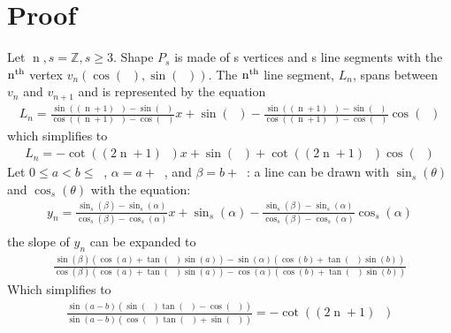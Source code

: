 \documentclass[11pt]{article}
\DeclareMathOperator{\custd}{\mathrm{d}_s}
\DeclareMathOperator{\custi}{\mathrm{n}}
\DeclareMathOperator{\period}{\frac{2\pi}{s}}
\DeclareMathOperator{\hp}{\frac{\pi}{s}}
\DeclareMathOperator{\iperiod}{\custi\frac{2\pi}{s}}
\begin{document}
\section{Proof}
Let \(\custi,s=\mathbb{Z},s\geq3\). Shape \(P_s\) is made of s vertices and s line segments with the \(\rm n^{th}\) vertex \(v_n(\cos(\iperiod), \sin(\iperiod))\). The \(\rm n^{th}\) line segment, \(L_n\), spans between \(v_n\) and \(v_{n+1}\) and is represented by the equation
\begin{gather*}
L_n=\frac{\sin((\custi+1)\period)-\sin(\iperiod)}{\cos((\custi+1)\period)-\cos(\iperiod)}x+\sin(\iperiod)-\frac{\sin((\custi+1)\period)-\sin(\iperiod)}{\cos((\custi+1)\period)-\cos(\iperiod)}\cos(\iperiod)
\end{gather*}
which simplifies to
\begin{gather*}
L_n=-\cot((2\custi+1)\hp)x+\sin(\iperiod)+\cot((2\custi+1)\hp)\cos(\iperiod)
\end{gather*}
Let \(0\leq a<b\leq\period\), \(\alpha=a+\iperiod\), and \(\beta=b+\iperiod\): a line can be drawn with \(\sin_s(\theta)\) and \(\cos_s(\theta)\) with the equation:
\begin{gather*}
y_n=\frac{\sin_s(\beta)-\sin_s(\alpha)}{\cos_s(\beta)-\cos_s(\alpha)}x+\sin_s(\alpha)-\frac{\sin_s(\beta)-\sin_s(\alpha)}{\cos_s(\beta)-\cos_s(\alpha)}\cos_s(\alpha)\\
\end{gather*}
the slope of \(y_n\) can be expanded to
\begin{gather*}
\frac{\sin(\beta)(\cos(a)+\tan(\hp)\sin(a))-\sin(\alpha)(\cos(b)+\tan(\hp)\sin(b))}{\cos(\beta)(\cos(a)+\tan(\hp)\sin(a))-\cos(\alpha)(\cos(b)+\tan(\hp)\sin(b))}
\end{gather*}
Which simplifies to
\begin{gather*}
\frac{\sin(a-b)(\sin(\iperiod)\tan(\hp)-\cos(\iperiod))}{\sin(a-b)(\cos(\iperiod)\tan(\hp)+\sin(\iperiod))}=-\cot((2\custi+1)\hp)
\end{gather*}
\end{document}
